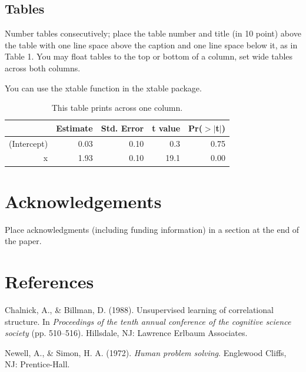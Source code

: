 \documentclass[10pt, letterpaper]{article}
\newenvironment{CSLReferences}%
  {}%
  {\par}
\begin{document}
\hypertarget{tables}{%
\subsection{Tables}\label{tables}}

Number tables consecutively; place the table number and title (in 10
point) above the table with one line space above the caption and one
line space below it, as in Table 1. You may float tables to the top or
bottom of a column, set wide tables across both columns.

You can use the xtable function in the xtable package.

\begin{table}[H]
\centering
\begin{tabular}{rrrrr}
  \hline
 & Estimate & Std. Error & t value & Pr($>$$|$t$|$) \\ 
  \hline
(Intercept) & 0.03 & 0.10 & 0.3 & 0.75 \\ 
  x & 1.93 & 0.10 & 19.1 & 0.00 \\ 
   \hline
\end{tabular}
\caption{This table prints across one column.} 
\end{table}

\hypertarget{acknowledgements}{%
\section{Acknowledgements}\label{acknowledgements}}

Place acknowledgments (including funding information) in a section at
the end of the paper.

\hypertarget{references}{%
\section{References}\label{references}}

\setlength{\parindent}{-0.1in} 
\setlength{\leftskip}{0.125in}

\noindent

\hypertarget{refs}{}
\begin{CSLReferences}{1}{0}
\leavevmode{}%
Chalnick, A., \& Billman, D. (1988). Unsupervised learning of
correlational structure. In \emph{Proceedings of the tenth annual
conference of the cognitive science society} (pp. 510--516). Hillsdale,
NJ: Lawrence Erlbaum Associates.

\leavevmode{}%
Newell, A., \& Simon, H. A. (1972). \emph{Human problem solving}.
Englewood Cliffs, NJ: Prentice-Hall.

\end{CSLReferences}


\end{document}
